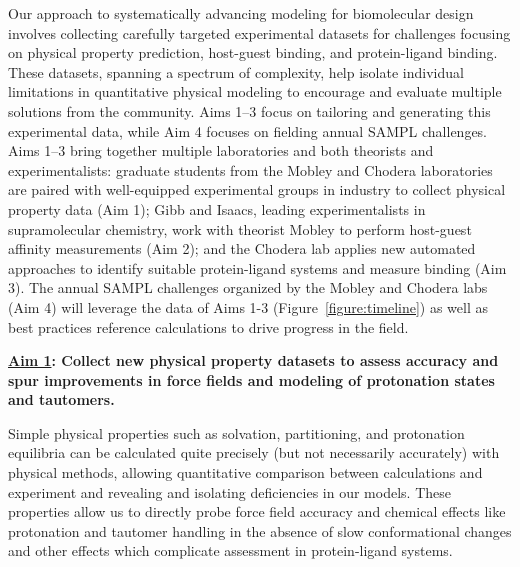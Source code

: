 \documentclass[11pt]{article}
\begin{document}
Our approach to systematically advancing modeling for biomolecular design involves collecting carefully targeted experimental datasets for challenges focusing on physical property prediction, host-guest binding, and protein-ligand binding.
These datasets, spanning a spectrum of complexity, help isolate individual limitations in quantitative physical modeling to encourage and evaluate multiple solutions from the community.
Aims 1--3 focus on tailoring and generating this experimental data, while Aim 4 focuses on fielding annual SAMPL challenges.
Aims 1--3 bring together multiple laboratories and both theorists and experimentalists: graduate students from the Mobley and Chodera laboratories are paired with well-equipped experimental groups in industry to collect physical property data (Aim 1); Gibb and Isaacs, leading experimentalists in supramolecular chemistry, work with theorist Mobley to perform host-guest affinity measurements (Aim 2); and the Chodera lab applies new automated approaches to identify suitable protein-ligand systems and measure binding (Aim 3).
The annual SAMPL challenges organized by the Mobley and Chodera labs (Aim 4) will leverage the data of Aims 1-3 (Figure~\ref{figure:timeline}) as well as best practices reference calculations to drive progress in the field. 

\textbf{\underline{Aim 1}: Collect new physical property datasets to assess accuracy and spur improvements in force fields and modeling of protonation states and tautomers.} 


Simple physical properties such as solvation, partitioning, and protonation equilibria can be calculated quite precisely (but not necessarily accurately) with physical methods, allowing quantitative comparison between calculations and experiment and revealing and isolating deficiencies in our models. 
These properties allow us to directly probe force field accuracy and chemical effects like protonation and tautomer handling in the absence of slow conformational changes and other effects which complicate assessment in protein-ligand systems. 
\end{document}

